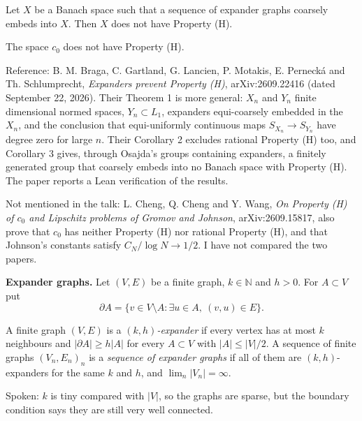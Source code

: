 \begin{theorem}
\label{theorem-expanders-prevent-h}
Let $X$ be a Banach space such that a
sequence of expander graphs coarsely embeds
into $X$. Then $X$ does not have
Property (H).
\end{theorem}

\begin{corollary}
\label{corollary-c0-not-h}
The space $c_0$ does not have Property (H).
\end{corollary}

\begin{remark}
\label{remark-expanders-prevent-h-paper}
Reference: B. M. Braga, C. Gartland,
G. Lancien, P. Motakis, E. Pernecká and
Th. Schlumprecht, \emph{Expanders prevent
Property (H)}, arXiv:2609.22416 (dated
September 22, 2026). Their Theorem 1 is more
general: $X_n$ and $Y_n$ finite dimensional
normed spaces, $Y_n \subset L_1$, expanders
equi-coarsely embedded in the $X_n$, and the
conclusion that equi-uniformly continuous
maps $S_{X_n} \to S_{Y_n}$ have degree zero
for large $n$. Their Corollary 2 excludes
rational Property (H) too, and Corollary 3
gives, through Osajda's groups containing
expanders, a finitely generated group that
coarsely embeds into no Banach space with
Property (H). The paper reports a Lean
verification of the results.

Not mentioned in the talk: L. Cheng,
Q. Cheng and Y. Wang, \emph{On Property (H)
of $c_0$ and Lipschitz problems of Gromov and
Johnson}, arXiv:2609.15817, also prove that
$c_0$ has neither Property (H) nor rational
Property (H), and that Johnson's constants
satisfy $C_N / \log N \to 1/2$. I have not
compared the two papers.
\end{remark}

\medskip\noindent
{\bf Expander graphs.} Let $(V,E)$ be a
finite graph, $k \in \mathbb{N}$ and $h > 0$.
For $A \subset V$ put
$$
\partial A
= \{v \in V \setminus A :
\exists u \in A,\ (v,u) \in E\}.
$$

\begin{definition}
\label{definition-expander}
A finite graph $(V,E)$ is a
\emph{$(k,h)$-expander} if every vertex has
at most $k$ neighbours and
$|\partial A| \ge h|A|$ for every
$A \subset V$ with $|A| \le |V|/2$. A
sequence of finite graphs $(V_n,E_n)_n$ is a
\emph{sequence of expander graphs} if all of
them are $(k,h)$-expanders for the same $k$
and $h$, and $\lim_n |V_n| = \infty$.
\end{definition}

\noindent
Spoken: $k$ is tiny compared with $|V|$, so
the graphs are sparse, but the boundary
condition says they are still very well
connected.

